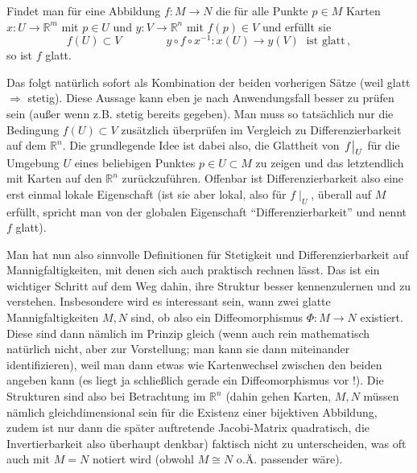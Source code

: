 \documentclass[../H_Analysis_main.tex]{subfiles}
\begin{document}
\begin{cor}
Findet man für eine Abbildung $f: M \rightarrow N$ die für alle Punkte $p \in M$ Karten $x: U \rightarrow \mathbb{R}^m$ mit $p \in U$ und $y: V \rightarrow \mathbb{R}^n$ mit $f(p) \in V$ und erfüllt sie
\begin{equation}
f(U) \subset V \qquad \qquad y \circ f \circ x^{-1}: x(U) \rightarrow y(V) \; \text{ ist glatt} \, ,
\end{equation}
so ist $f$ glatt.
\end{cor}
Das folgt natürlich sofort als Kombination der beiden vorherigen Sätze (weil glatt $\Rightarrow$ stetig). Diese Aussage kann eben je nach Anwendungsfall besser zu prüfen sein (außer wenn z.B. stetig bereits gegeben). Man muss so tatsächlich nur die Bedingung $f(U) \subset V$ zusätzlich überprüfen im Vergleich zu Differenzierbarkeit auf dem $\mathbb{R}^n$. Die grundlegende Idee ist dabei also, die Glattheit von $\eval{f}_U$ für die Umgebung $U$ eines beliebigen Punktes $p \in U \subset M$ zu zeigen und das letztendlich mit Karten auf den $\mathbb{R}^n$ zurückzuführen. Offenbar ist Differenzierbarkeit also eine erst einmal lokale Eigenschaft (ist sie aber lokal, also für $f\mid_U$, überall auf $M$ erfüllt, spricht man von der globalen Eigenschaft \enquote{Differenzierbarkeit} und nennt $f$ glatt).


Man hat nun also sinnvolle Definitionen für Stetigkeit und Differenzierbarkeit auf Mannigfaltigkeiten, mit denen sich auch praktisch rechnen lässt. Das ist ein wichtiger Schritt auf dem Weg dahin, ihre Struktur besser kennenzulernen und zu verstehen. Insbesondere wird es interessant sein, wann zwei glatte Mannigfaltigkeiten $M, N$  sind, ob also ein Diffeomorphismus $\Phi: M \rightarrow N$ existiert. Diese sind dann nämlich im Prinzip gleich (wenn auch rein mathematisch natürlich nicht, aber zur Vorstellung; man kann sie dann miteinander identifizieren), weil man dann etwas wie Kartenwechsel zwischen den beiden angeben kann (es liegt ja schließlich gerade ein Diffeomorphismus vor !). Die Strukturen sind also bei Betrachtung im $\mathbb{R}^n$ (dahin gehen Karten, $M, N$ müssen nämlich gleichdimensional sein für die Existenz einer bijektiven Abbildung, zudem ist nur dann die später auftretende Jacobi-Matrix quadratisch, die Invertierbarkeit also überhaupt denkbar) faktisch nicht zu unterscheiden, was oft auch mit $M = N$ notiert wird (obwohl $M \cong N$ o.Ä. passender wäre).
\end{document}
